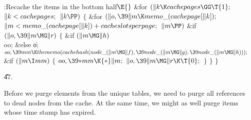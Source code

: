 \B{}:Recache the items in the bottom half\X${}\E{}$\6
\&{for} ${}(\|k\K\\{cachepages}\GG\T{1};{}$ ${}\|k<\\{cachepages};{}$ ${}\|k%
\PP){}$\5
${}\{{}$\1\6
\&{for} ${}(\|o,\39\|m\K\\{memo\_}(\\{cachepage}[\|k]);{}$ ${}\|m<\\{memo\_}(%
\\{cachepage}[\|k])+\\{cacheslotsperpage};{}$ ${}\|m\PP){}$\1\6
\&{if} ${}(\|o,\39\|m\MG\|r){}$\5
${}\{{}$\1\6
\&{if} ${}(\|m\MG\|h){}$\1\5
\\{oo};\5
\2\&{else}\1\5
\|o;\2\6
${}\\{oo},\39\\{mm}\K\\{thememo}(\\{cachehash}(\\{node\_}(\|m\MG\|f),\39\\{node%
\_}(\|m\MG\|g),\39\\{node\_}(\|m\MG\|h)));{}$\6
\&{if} ${}(\|m\I\\{mm}){}$\5
${}\{{}$\1\6
${}\\{oo},\39{*}\\{mm}\K{*}\|m;{}$\6
${}\|o,\39\|m\MG\|r\K\T{0};{}$\6
\4${}\}{}$\2\6
\4${}\}{}$\2\2\6
\4${}\}{}$\2\par
\U47.\fi

Before we purge elements from the unique tables, we need to purge all
references to dead nodes from the cache. At the same time, we might as
well purge items whose time stamp has expired.

